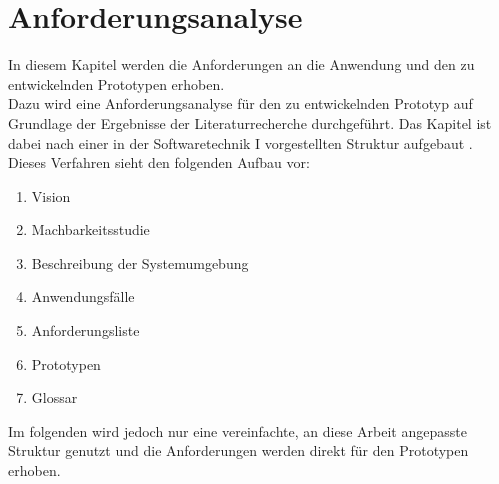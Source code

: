 \chapter{Anforderungsanalyse}\label{chapter:anforderungsanalyse}
In diesem Kapitel werden die Anforderungen an die Anwendung und den zu entwickelnden Prototypen erhoben. \\
Dazu wird eine Anforderungsanalyse für den zu entwickelnden Prototyp auf Grundlage der Ergebnisse der Literaturrecherche durchgeführt.
Das Kapitel ist dabei nach einer in der Softwaretechnik I  vorgestellten Struktur aufgebaut \citep[Folie 209-214]{winter:srs-anforderungen}. \\
Dieses Verfahren sieht den folgenden Aufbau vor:
\begin{enumerate}
\item Vision 
\item Machbarkeitsstudie
\item Beschreibung der Systemumgebung
\item Anwendungsfälle
\item Anforderungsliste
\item Prototypen
\item Glossar
\end{enumerate}
Im folgenden wird jedoch nur eine vereinfachte, an diese Arbeit angepasste Struktur genutzt und die Anforderungen werden direkt für den Prototypen erhoben.



